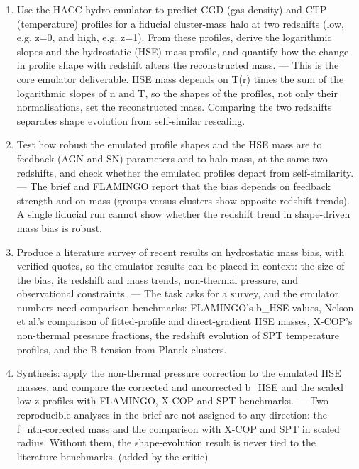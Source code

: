 \documentclass[11pt,a4paper]{article}
\begin{document}
\begin{enumerate}
  \item Use the HACC hydro emulator to predict CGD (gas density) and CTP (temperature) profiles for a fiducial cluster-mass halo at two redshifts (low, e.g. z=0, and high, e.g. z=1). From these profiles, derive the logarithmic slopes and the hydrostatic (HSE) mass profile, and quantify how the change in profile shape with redshift alters the reconstructed mass. --- This is the core emulator deliverable. HSE mass depends on T(r) times the sum of the logarithmic slopes of n and T, so the shapes of the profiles, not only their normalisations, set the reconstructed mass. Comparing the two redshifts separates shape evolution from self-similar rescaling.
  \item Test how robust the emulated profile shapes and the HSE mass are to feedback (AGN and SN) parameters and to halo mass, at the same two redshifts, and check whether the emulated profiles depart from self-similarity. --- The brief and FLAMINGO report that the bias depends on feedback strength and on mass (groups versus clusters show opposite redshift trends). A single fiducial run cannot show whether the redshift trend in shape-driven mass bias is robust.
  \item Produce a literature survey of recent results on hydrostatic mass bias, with verified quotes, so the emulator results can be placed in context: the size of the bias, its redshift and mass trends, non-thermal pressure, and observational constraints. --- The task asks for a survey, and the emulator numbers need comparison benchmarks: FLAMINGO's b\_HSE values, Nelson et al.'s comparison of fitted-profile and direct-gradient HSE masses, X-COP's non-thermal pressure fractions, the redshift evolution of SPT temperature profiles, and the B tension from Planck clusters.
  \item Synthesis: apply the non-thermal pressure correction to the emulated HSE masses, and compare the corrected and uncorrected b\_HSE and the scaled low-z profiles with FLAMINGO, X-COP and SPT benchmarks. --- Two reproducible analyses in the brief are not assigned to any direction: the f\_nth-corrected mass and the comparison with X-COP and SPT in scaled radius. Without them, the shape-evolution result is never tied to the literature benchmarks. (added by the critic)

\end{enumerate}
\end{document}
